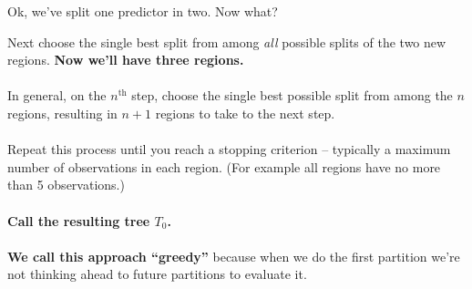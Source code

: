 \documentclass[mathserif, aspectratio=169]{beamer}
\begin{document}
\begin{frame}{Ok, we've split one predictor in two.  Now what?}

Next choose the single best split from among \textit{all} possible splits of the two new regions. \textbf{Now we'll have three regions.}\\~\\

In general, on the $n^\text{th}$ step, choose the single best possible split from among the $n$ regions, resulting in $n+1$ regions to take to the next step. \\~\\

Repeat this process until you reach a stopping criterion -- typically a maximum number of observations in each region. (For example all regions have no more than 5 observations.) \\~\\ \textbf{Call the resulting tree $T_0$.} \\~\\

\textbf{We call this approach ``greedy''} because when we do the first partition we're not thinking ahead to future partitions to evaluate it.  
\end{frame}
\end{document}
